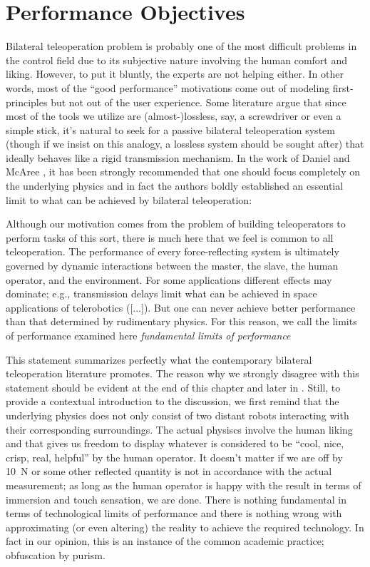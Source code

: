 \chapter{Performance Objectives}
\label{chap:perf}


Bilateral teleoperation problem is probably one of the most difficult problems in the control field due to its 
subjective nature involving the human comfort and liking. However, to put it bluntly, the experts are not helping 
either. In other words, most of the \enquote{good performance} motivations come out of modeling first-principles 
but not out of the user experience. 
Some literature argue that since most of the tools we utilize are (almost-)lossless, say, a 
screwdriver or even a simple stick, it's natural to seek for a passive bilateral teleoperation system (though if we
insist on this analogy, a lossless system should be sought after) that ideally behaves like a rigid transmission mechanism. In the work of 
Daniel and McAree \cite{danielmcaree}, it has been strongly recommended that one should focus completely on the underlying physics and in 
fact the authors boldly established an essential limit to what can be achieved by bilateral teleoperation:
\begin{displayquote}
Although our motivation comes from the problem of building teleoperators to perform tasks of this sort, there is much here that we feel is 
common to all teleoperation. The performance of every force-reflecting system is ultimately governed by dynamic interactions between the 
master, the slave, the human operator, and the environment. For some applications different effects may dominate; e.g., transmission delays
limit what can be achieved in space applications of telerobotics ([...]). But one can never achieve better performance than that determined 
by rudimentary physics. For this reason, we call the limits of performance examined here \emph{fundamental limits of performance}
\end{displayquote}
This statement summarizes perfectly what the contemporary bilateral teleoperation literature promotes. The reason why we strongly 
disagree with this statement should be evident at the end of this chapter and later in . Still, to provide a contextual 
introduction to the discussion, we first remind that the underlying physics does not only consist of two distant robots interacting with 
their corresponding surroundings. The actual physiscs involve the human liking and that gives us freedom to display whatever is considered 
to be \enquote{cool, nice, crisp, real, helpful} by the human operator. It doesn't matter if we are off by \SI{10}{\newton} or some other reflected 
quantity is not in accordance with the actual measurement; as long as the human operator is happy with the result in terms of immersion and 
touch sensation, we are done. There is nothing fundamental in terms of technological limits of performance and there is nothing wrong with 
approximating (or even altering) the reality to achieve the required technology. In fact in our opinion, this is an instance of the common academic 
practice; obfuscation by purism.


